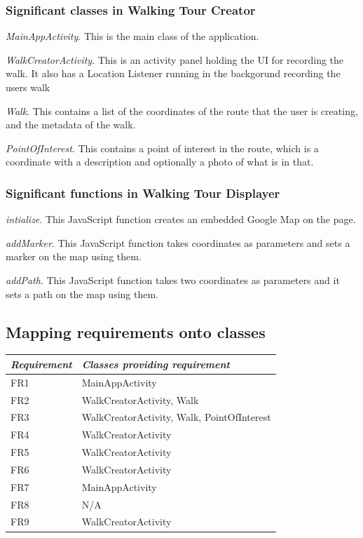 \documentclass{project}
\begin{document}
\subsubsection{Significant classes in Walking Tour Creator}
\emph{MainAppActivity}. This is the main class of the application.

\emph{WalkCreatorActivity}. This is an activity panel holding the UI for
recording the walk. It also has a Location Listener running in the backgorund recording the users walk

\emph{Walk}. This contains a list of the coordinates of the route that the user
is creating, and the metadata of the walk.

\emph{PointOfInterest}. This contains a point of interest in the route, which
is a coordinate with a description and optionally a photo of what is in that.

\subsubsection{Significant functions in Walking Tour Displayer}
\emph{intialize}. This JavaScript function creates an embedded Google Map on
the page.

\emph{addMarker}. This JavaScript function takes coordinates as parameters and
sets a marker on the map using them.

\emph{addPath}. This JavaScript function takes two coordinates as parameters
and it sets a path on the map using them.


\subsection{Mapping requirements onto classes}
\begin{tabular}{|l |l |}
\hline
\emph{Requirement} & \emph{Classes providing requirement} \\
\hline
FR1 & MainAppActivity \\
\hline
FR2 & WalkCreatorActivity, Walk \\
\hline
FR3 & WalkCreatorActivity, Walk, PointOfInterest  \\
\hline
FR4 & WalkCreatorActivity \\
\hline
FR5 & WalkCreatorActivity \\
\hline
FR6 & WalkCreatorActivity \\
\hline
FR7 & MainAppActivity \\
\hline
FR8 & N/A \\
\hline
FR9 & WalkCreatorActivity \\
\hline
\end{tabular}
\end{document}
